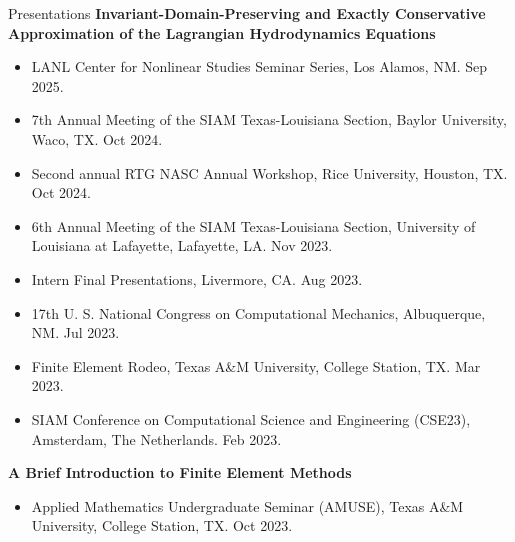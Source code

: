 \documentclass{resume} %
\begin{document}
\begin{rSection}{Presentations}
\textbf{Invariant-Domain-Preserving and Exactly Conservative Approximation of the Lagrangian Hydrodynamics Equations}
\begin{itemize}
   \item LANL Center for Nonlinear Studies Seminar Series, Los Alamos, NM. Sep 2025.
   \item 7th Annual Meeting of the SIAM Texas-Louisiana Section, Baylor University, Waco, TX. Oct 2024.
   \item Second annual RTG NASC Annual Workshop, Rice University, Houston, TX. Oct 2024.
   \item 6th Annual Meeting of the SIAM Texas-Louisiana Section, University of Louisiana at Lafayette, Lafayette, LA. Nov 2023.
   \item Intern Final Presentations, Livermore, CA. Aug 2023.
   \item 17th U. S. National Congress on Computational Mechanics, Albuquerque, NM. Jul 2023.
   \item Finite Element Rodeo, Texas A\&M University, College Station, TX. Mar 2023.
   \item SIAM Conference on Computational Science and Engineering (CSE23), Amsterdam, The Netherlands. Feb 2023.
\end{itemize}
\textbf{A Brief Introduction to Finite Element Methods}
\begin{itemize}
   \item Applied Mathematics Undergraduate Seminar (AMUSE), Texas A\&M University, College Station, TX. Oct 2023.
\end{itemize}
\end{rSection}
\end{document}

